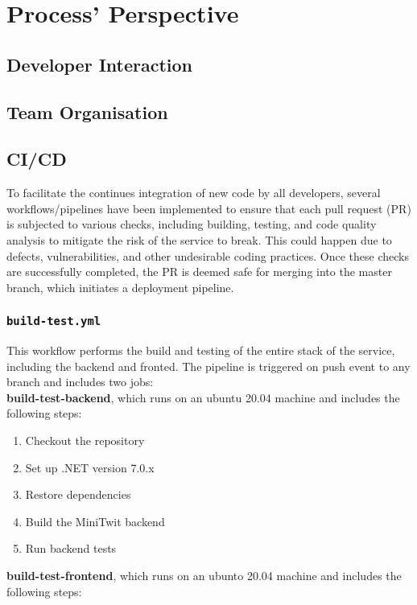 \chapter{Process' Perspective}

\section{Developer Interaction}

\section{Team Organisation}

\section{CI/CD}
To facilitate the continues integration of new code by all developers, several workflows/pipelines have been implemented to ensure that each pull request (PR) is subjected to various checks, including building, testing, and code quality analysis to mitigate the risk of the service to break. This could happen due to defects, vulnerabilities, and other undesirable coding practices. Once these checks are successfully completed, the PR is deemed safe for merging into the master branch, which initiates a deployment pipeline.

\subsection{\texttt{build-test.yml}}
This workflow performs the build and testing of the entire stack of the service, including the backend and fronted. The pipeline is triggered on push event to any branch and includes two jobs: \\

\textbf{build-test-backend}, which runs on an ubuntu 20.04 machine and includes the following steps:

\begin{enumerate}
    \item Checkout the repository
    \item Set up .NET version 7.0.x
    \item Restore dependencies
    \item Build the MiniTwit backend
    \item Run backend tests
\end{enumerate}

\textbf{build-test-frontend}, which runs on an ubunto 20.04 machine and includes the following steps:

